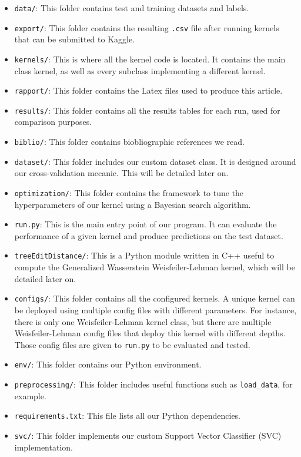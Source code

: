 \documentclass{IEEEtran}
\begin{document}
\begin{itemize}
    \item \texttt{data/}: This folder contains test and training datasets and labels.
    \item \texttt{export/}: This folder contains the resulting \texttt{.csv} file after running kernels that can be submitted to Kaggle.
    \item \texttt{kernels/}: This is where all the kernel code is located. It contains the main class kernel, as well as every subclass implementing a different kernel.
    \item \texttt{rapport/}: This folder contains the Latex files used to produce this article.
    \item \texttt{results/}: This folder contains all the results tables for each run, used for comparison purposes.
    \item \texttt{biblio/}: This folder contains biobliographic references we read.
    \item \texttt{dataset/}: This folder includes our custom dataset class. It is designed around our cross-validation mecanic. This will be detailed later on.
    \item \texttt{optimization/}: This folder contains the framework to tune the hyperparameters of our kernel using a Bayesian search algorithm.
    \item \texttt{run.py}: This is the main entry point of our program. It can evaluate the performance of a given kernel and produce predictions on the test dataset.
    \item \texttt{treeEditDistance/}: This is a Python module written in C++ useful to compute the Generalized Wasserstein Weisfeiler-Lehman kernel, which will be detailed later on.
    \item \texttt{configs/}: This folder contains all the configured kernels. A unique kernel can be deployed using multiple config files with different parameters. For instance, there is only one Weisfeiler-Lehman kernel class, but there are multiple Weisfeiler-Lehman config files that deploy this kernel with different depths. Those config files are given to \texttt{run.py} to be evaluated and tested.
    \item \texttt{env/}: This folder contains our Python environment.
    \item \texttt{preprocessing/}: This folder includes useful functions such as \texttt{load\_data}, for example.
    \item \texttt{requirements.txt}: This file lists all our Python dependencies.
    \item \texttt{svc/}: This folder implements our custom Support Vector Classifier (SVC) implementation.
\end{itemize}
\end{document}
